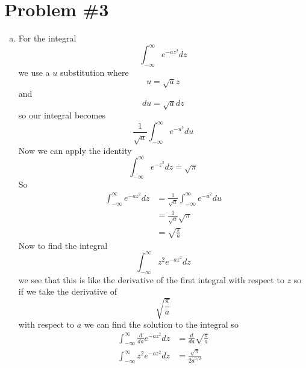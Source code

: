 \documentclass[11pt]{article}
\numberwithin{equation}{section}
\begin{document}
\section{Problem \#3}
\begin{enumerate}[(a)]
\item
For the integral
$$\int_{-\infty}^{\infty}e^{-az^2}dz$$
we use a $u$ substitution where
$$u = \sqrt{a}z$$
and
$$du = \sqrt{a}dz$$
so our integral becomes 
$$\frac{1}{\sqrt{a}}\int_{-\infty}^{\infty}e^{-u^2}du$$
Now we can apply the identity 
$$\int_{-\infty}^{\infty}e^{-z^2}dz = \sqrt{\pi}$$
So 
\begin{align*}
\int_{-\infty}^{\infty}e^{-az^2}dz &= \frac{1}{\sqrt{a}}\int_{-\infty}^{\infty}e^{-u^2}du\\
&= \frac{1}{\sqrt{a}}\sqrt{\pi}\\
&= \sqrt{\frac{\pi}{a}}
\end{align*}
Now to find the integral
$$\int_{-\infty}^{\infty}z^2e^{-az^2}dz$$
we see that this is like the derivative of the first integral with respect to $z$ so if we take the derivative of
$$\sqrt{\frac{\pi}{a}}$$
with respect to $a$ we can find the solution to the integral so
\begin{align*}
\int_{-\infty}^{\infty}\frac{d}{da}e^{-az^2}dz &= \frac{d}{da}\sqrt{\frac{\pi}{a}}\\
\int_{-\infty}^{\infty}z^2e^{-az^2}dz &= \frac{\sqrt{\pi}}{2a^{3/2}}
\end{align*}


\end{enumerate}
\end{document}
